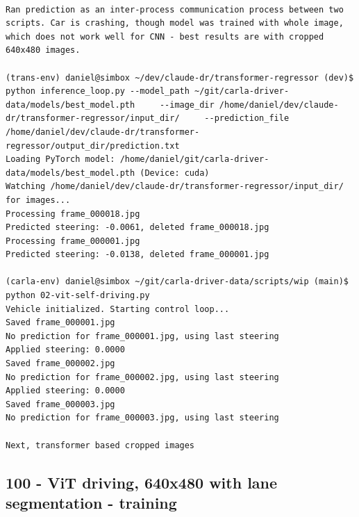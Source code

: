 \begin{verbatim}

Ran prediction as an inter-process communication process between two scripts. Car is crashing, though model was trained with whole image, which does not work well for CNN - best results are with cropped 640x480 images.

(trans-env) daniel@simbox ~/dev/claude-dr/transformer-regressor (dev)$ python inference_loop.py --model_path ~/git/carla-driver-data/models/best_model.pth     --image_dir /home/daniel/dev/claude-dr/transformer-regressor/input_dir/     --prediction_file /home/daniel/dev/claude-dr/transformer-regressor/output_dir/prediction.txt
Loading PyTorch model: /home/daniel/git/carla-driver-data/models/best_model.pth (Device: cuda)
Watching /home/daniel/dev/claude-dr/transformer-regressor/input_dir/ for images...
Processing frame_000018.jpg
Predicted steering: -0.0061, deleted frame_000018.jpg
Processing frame_000001.jpg
Predicted steering: -0.0138, deleted frame_000001.jpg

(carla-env) daniel@simbox ~/git/carla-driver-data/scripts/wip (main)$ python 02-vit-self-driving.py 
Vehicle initialized. Starting control loop...
Saved frame_000001.jpg
No prediction for frame_000001.jpg, using last steering
Applied steering: 0.0000
Saved frame_000002.jpg
No prediction for frame_000002.jpg, using last steering
Applied steering: 0.0000
Saved frame_000003.jpg
No prediction for frame_000003.jpg, using last steering

Next, transformer based cropped images

\end{verbatim}

\subsection{100 - ViT driving, 640x480 with lane segmentation - training}
\label{app_res:100}

